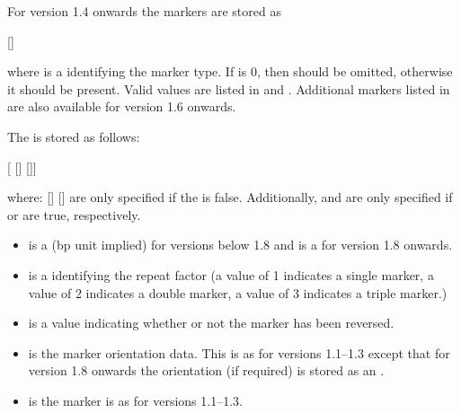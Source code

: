 \begin{numbered}
\begin{enumerate}
\begin{enumerate}
  For version 1.4 onwards the markers are stored as
  \begin{syntaxline}
  []
  \end{syntaxline}
  where  is a  identifying the marker type.
  If  is 0, then  should be omitted,
  otherwise it should be present. Valid  values are listed
  in  and .
  Additional markers listed in  are also
  available for version 1.6 onwards.

  The  is stored as follows:
  \begin{syntaxline}
     
   
  [ []
   []]
  \end{syntaxline}
  where:
   []
   []
  are only specified if the  is false.
  Additionally,
   and  are only
  specified if  or 
  are true, respectively.

    \begin{itemize}
    \item {} is a  (\gls*{bp} unit implied) for
    versions below 1.8 and is a  for version 1.8 onwards.

    \item {} is a  identifying the repeat factor
    (a value of 1 indicates a single marker, a value of 2 indicates
    a double marker, a value of 3 indicates a triple marker.)

    \item {} is a  value indicating whether
    or not the marker has been reversed.

    \item {} is the marker orientation data. This is as
    for versions 1.1--1.3 except that for version 1.8 onwards the
    orientation  (if required) is stored as an .

    \item {} is the marker  is as for
    versions 1.1--1.3.


\end{itemize}
\end{enumerate}
\end{enumerate}
\end{numbered}
